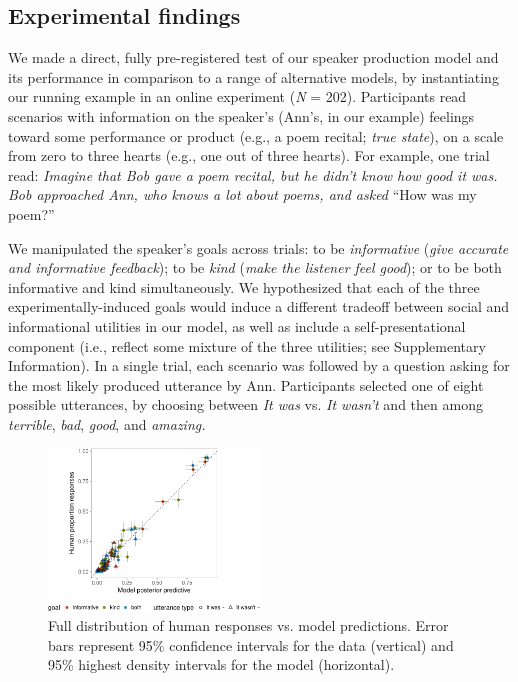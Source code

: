 \documentclass[9pt,twocolumn,twoside,lineno]{main_class_file}
\begin{document}
\subsection*{Experimental findings}
We made a direct, fully pre-registered test of our speaker production model and its performance in comparison to a range of alternative models, by instantiating our running example in an online experiment (\emph{N} = 202).
Participants read scenarios with information on the speaker's (Ann's,
in our example) feelings toward some performance or product (e.g., a poem
recital; \emph{true state}), on a scale from zero to three hearts (e.g.,
one out of three hearts). For example, one trial read: \emph{Imagine
that Bob gave a poem recital, but he didn't know how good it was. Bob
approached Ann, who knows a lot about poems, and asked} ``How was my poem?''


We manipulated the speaker's goals across trials: to be
\emph{informative} (\emph{give accurate and informative feedback});
to be \emph{kind} (\emph{make the listener feel good}); or to be
both informative and kind simultaneously. We hypothesized that
each of the three experimentally-induced goals would induce a different tradeoff between social and informational
utilities in our model, as well as include a self-presentational component (i.e., reflect some mixture of the three utilities; see Supplementary Information). In a single
trial, each scenario was followed by a question asking for the most
likely produced utterance by Ann. Participants selected one of eight possible
utterances, by choosing between \emph{It was} vs. \emph{It wasn't} and
then among \emph{terrible}, \emph{bad}, \emph{good}, and \emph{amazing.}

\begin{figure}[!h]
\includegraphics[width=0.5\textwidth]{fig/variance-1} \caption{Full distribution of human responses vs. model predictions. Error bars represent 95\% confidence intervals for the data (vertical) and 95\% highest density intervals for the model (horizontal).}\label{fig:variance}
\end{figure}
\end{document}
